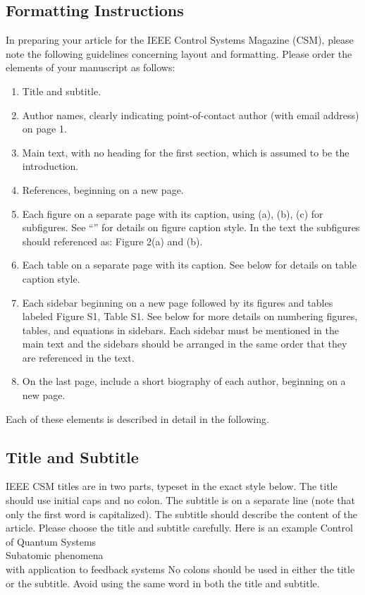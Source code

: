 \subsection{Formatting Instructions}

In preparing your article for the IEEE Control Systems Magazine (CSM), please note the following guidelines concerning layout and formatting. Please order the elements of your manuscript as follows:  
\begin{enumerate}
\item Title and subtitle.
\item Author names, clearly indicating point-of-contact author (with email address) on page 1.
\item Main text, with no heading for the first section, which is assumed to be the introduction.
\item References, beginning on a new page.
\item Each figure on a separate page with its caption, using (a), (b), (c) for subfigures. See ``'' for details on figure caption style. In the text the subfigures should referenced as: Figure 2(a) and (b).
\item Each table on a separate page with its caption.  See below for details on table caption style.
\item Each sidebar beginning on a new page followed by its figures and tables labeled Figure S1, Table S1.  See below for more details on numbering figures, tables, and equations in sidebars. Each sidebar must be mentioned in the main text and the sidebars should be arranged in the same order that they are referenced in the text. 
\item On the last page, include a short biography of each author, beginning on a new page. 
\end{enumerate}
Each of these elements is described in detail in the following.


\subsection{Title and Subtitle}
IEEE CSM titles are in two parts, typeset in the exact style below.
The title should use initial caps and no colon.
The subtitle is on a separate line (note that only the first word is capitalized).
The subtitle should describe the content of the article.
Please choose the title and subtitle carefully.  Here is an example
\bc
{\Huge Control of Quantum Systems} \\
{\Large Subatomic phenomena\\
with application to feedback systems}
\ec
No colons should be used in either the title or the subtitle.  Avoid using the same word in both the title and subtitle.

